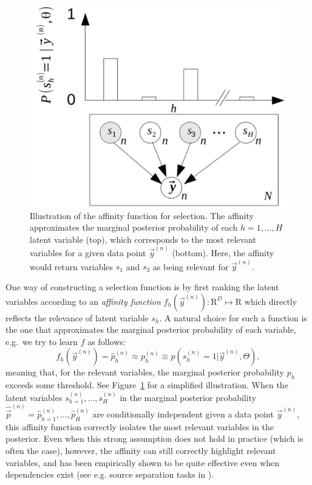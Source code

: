\begin{figure}[h]
\begin{center}
\includegraphics[width=.535\textwidth]{graph-affinity2.pdf}
\caption{Illustration of the affinity function for selection.
The affinity approximates the marginal posterior probability of each $h=1,\dots,H$ latent variable (top), 
which corresponds to the most relevant variables for a given data point $\vec{y}^{(n)}$ (bottom). 
Here, the affinity would return variables $s_1$ and $s_3$ as being relevant for $\vec{y}^{(n)}$. 
}\label{fig:graph-affinity}
\end{center}
\end{figure}
%
One way of constructing a selection function %
is by first ranking the latent variables according to an 
\emph{affinity function} $f_h(\vec{y}^{(n)}) : \mathrm{R}^D \mapsto \mathrm{R}$ %
which directly reflects the relevance of latent variable $s_h$. 
%
A natural choice for such a function is the one that approximates the marginal posterior probability 
of each variable, e.g.\ we try to learn $f$ as follows:
%
\begin{equation}
\label{eq:affinity}
f_h(\vec{y}^{(n)}) = \hat{p}_h^{(n)} \approx p^{(n)}_h \equiv p(s^{(n)}_h = 1|\vec{y}^{(n)}, \Theta),
\end{equation}
%
meaning that, for the relevant variables, the marginal posterior probability $p_h$ 
exceeds some threshold. %
See Figure~\ref{fig:graph-affinity} for a simplified illustration. 
%
When the latent variables $s_{h=1}^{(n)}, \dots, s_H^{(n)}$ in the marginal posterior probability $\hat{\vec{p}}^{(n)} = \hat{p}_{h=1}^{(n)},\dots, \hat{p}_H^{(n)}$ are conditionally independent given a data point $\vec{y}^{(n)}$, this affinity function correctly isolates the most relevant variables in the posterior.
%
Even when this strong assumption does not hold in practice (which is often the case), however,
the affinity can still correctly highlight relevant variables,
and has been empirically shown to be quite effective even when dependencies exist (see e.g. source separation tasks in \citep{SheikhEtAl2014}).


